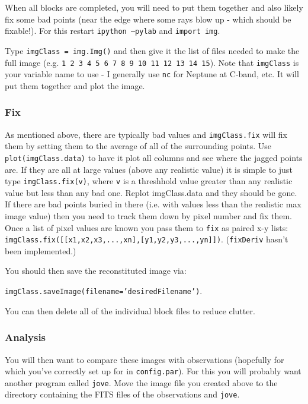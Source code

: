 \documentclass[11pt]{article}
\begin{document}
When all blocks are completed, you will need to put them together and also likely fix some bad points (near the edge where some rays blow up - which should be fixable!).  For this restart \texttt{ipython --pylab} and \texttt{import img}.

Type \texttt{imgClass = img.Img()} and then give it the list of files needed to make the full image (e.g. \texttt{1 2 3 4 5 6 7 8 9 10 11 12 13 14 15}). Note that \texttt{imgClass} is your variable name to use - I generally use \texttt{nc} for Neptune at C-band, etc.  It will put them together and plot the image.    

\subsubsection{Fix}
As mentioned above, there are typically bad values and \texttt{imgClass.fix} will fix them by setting them to the average of all of the surrounding points.
Use \texttt{plot(imgClass.data)} to have it plot all columns and see where the jagged points are.  If they are all at large values (above any realistic value) it is simple to just type \texttt{imgClass.fix(v)}, where \texttt{v} is a threshhold value greater than any realistic value but less than any bad one.  Replot imgClass.data and they should be gone.  If there are bad points buried in there (i.e. with values less than the realistic max image value) then you need to track them down by pixel number and fix them.  Once a list of pixel values are known you pass them to \texttt{fix} as paired x-y lists:  \texttt{imgClass.fix([[x1,x2,x3,...,xn],[y1,y2,y3,...,yn]])}.  
(\texttt{fixDeriv} hasn't been implemented.)

You should then save the reconstituted image via: 

\texttt{imgClass.saveImage(filename='desiredFilename')}.

\noindent
You can then delete all of the individual block files to reduce clutter.

\subsubsection{Analysis}
You will then want to compare these images with observations (hopefully for which you've correctly set up for in \texttt{config.par}).  For this you will probably want another program called \texttt{jove}.  Move the image file you created above to the directory containing the FITS files of the observations and \texttt{jove}.
\end{document}
